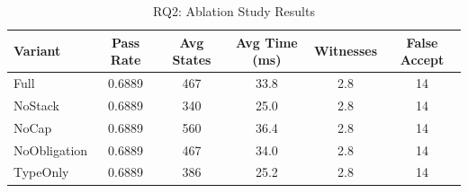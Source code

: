 \begin{table}[t]
\centering
\caption{RQ2: Ablation Study Results}
\label{tab:rq2}
\begin{tabular}{lccccc}
\toprule
Variant & Pass Rate & Avg States & Avg Time (ms) & Witnesses & False Accept \\
\midrule
Full & 0.6889 & 467 & 33.8 & 2.8 & 14 \\
NoStack & 0.6889 & 340 & 25.0 & 2.8 & 14 \\
NoCap & 0.6889 & 560 & 36.4 & 2.8 & 14 \\
NoObligation & 0.6889 & 467 & 34.0 & 2.8 & 14 \\
TypeOnly & 0.6889 & 386 & 25.2 & 2.8 & 14 \\
\bottomrule
\end{tabular}
\end{table}